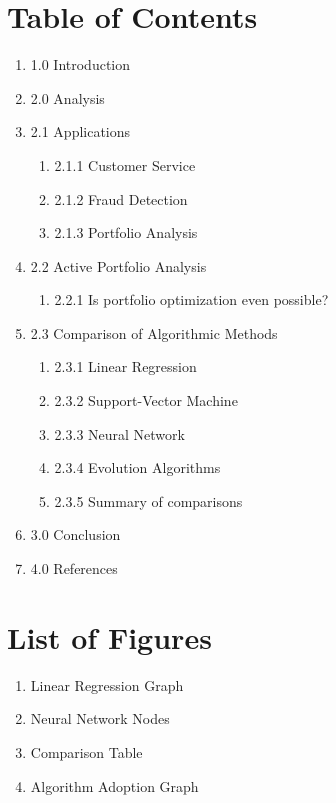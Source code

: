 \documentclass[12pt]{report}
\begin{document}
\section*{\centering Table of Contents}
\normalsize
\begin{enumerate}[label={},leftmargin=*,labelsep=2ex]
    \item 1.0 Introduction 
    \item 2.0 Analysis 
    \item 2.1 Applications 
      \begin{enumerate}[label*={},leftmargin=*,labelsep=2ex]
        \item 2.1.1 Customer Service 
        \item 2.1.2 Fraud Detection 
        \item 2.1.3 Portfolio Analysis 
      \end{enumerate}
    \item 2.2 Active Portfolio Analysis 
    \begin{enumerate}[label*={},leftmargin=*,labelsep=2ex]
    	\item 2.2.1 Is portfolio optimization even possible? 
    \end{enumerate}
   	\item 2.3 Comparison of Algorithmic Methods 
    \begin{enumerate}[label*={},leftmargin=*,labelsep=2ex]
        \item 2.3.1 Linear Regression 
        \item 2.3.2 Support-Vector Machine 
        \item 2.3.3 Neural Network 
        \item 2.3.4 Evolution Algorithms 
      	\item 2.3.5 Summary of comparisons 
    \end{enumerate}
    \item 3.0 Conclusion 
    \item 4.0 References 
\end{enumerate}

\newpage\thispagestyle{fancy}\sectionfont{\scshape}
\section*{\centering List of Figures}
\normalsize{}
\begin{enumerate}[label=\arabic*,leftmargin=*,labelsep=2ex,ref=\arabic*]
    \item Linear Regression Graph 
    \item Neural Network Nodes 
    \item Comparison Table 
    \item Algorithm Adoption Graph 
\end{enumerate}
\end{document}
